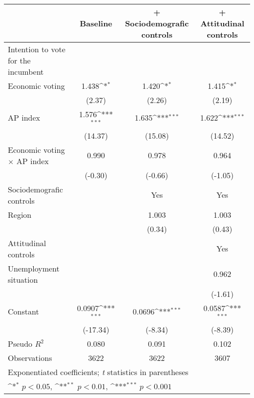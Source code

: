 {
\def\sym#1{\ifmmode^{#1}\else\(^{#1}\)\fi}
\begin{tabular}{l*{3}{c}}
\toprule
                & Baseline         &+ Sociodemografic controls         &+ Attitudinal controls         \\
\midrule
Intention to vote for the incumbent&                  &                  &                  \\
Economic voting &    1.438\sym{*}  &    1.420\sym{*}  &    1.415\sym{*}  \\
                &   (2.37)         &   (2.26)         &   (2.19)         \\
AP index        &    1.576\sym{***}&    1.635\sym{***}&    1.622\sym{***}\\
                &  (14.37)         &  (15.08)         &  (14.52)         \\
Economic voting $\times$ AP index&    0.990         &    0.978         &    0.964         \\
                &  (-0.30)         &  (-0.66)         &  (-1.05)         \\
Sociodemografic controls&                  &      Yes         &      Yes         \\
Region          &                  &    1.003         &    1.003         \\
                &                  &   (0.34)         &   (0.43)         \\
Attitudinal controls&                  &                  &      Yes         \\
Unemployment situation&                  &                  &    0.962         \\
                &                  &                  &  (-1.61)         \\
Constant        &   0.0907\sym{***}&   0.0696\sym{***}&   0.0587\sym{***}\\
                & (-17.34)         &  (-8.34)         &  (-8.39)         \\
\midrule
Pseudo \(R^{2}\)&    0.080         &    0.091         &    0.102         \\
Observations    &     3622         &     3622         &     3607         \\
\bottomrule
\multicolumn{4}{l}{\footnotesize Exponentiated coefficients; \textit{t} statistics in parentheses}\\
\multicolumn{4}{l}{\footnotesize \sym{*} \(p<0.05\), \sym{**} \(p<0.01\), \sym{***} \(p<0.001\)}\\
\end{tabular}
}
